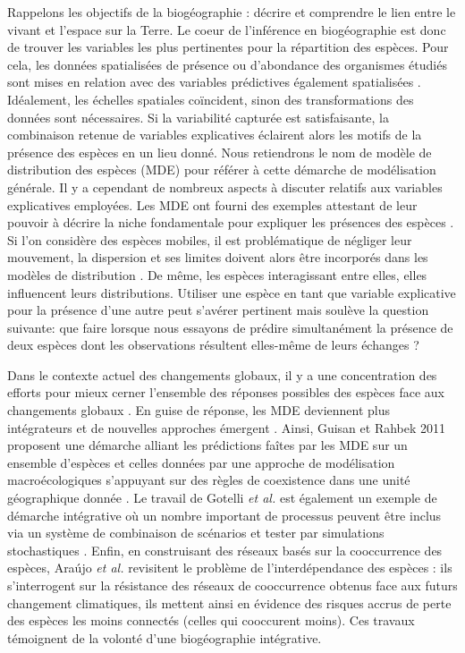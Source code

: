 Rappelons les objectifs de la biogéographie : décrire et comprendre le
lien entre le vivant et l'espace sur la Terre. Le coeur de l'inférence
en biogéographie est donc de trouver les variables les plus pertinentes
pour la répartition des espèces. Pour cela, les données spatialisées de
présence ou d'abondance des organismes étudiés sont mises en relation
avec des variables prédictives également spatialisées
\cite{Guisan2005,Peterson2011,Elith2009a}. Idéalement, les échelles
spatiales coïncident, sinon des transformations des données sont
nécessaires. Si la variabilité capturée est satisfaisante, la
combinaison retenue de variables explicatives éclairent alors les motifs
de la présence des espèces en un lieu donné. Nous retiendrons le nom de
modèle de distribution des espèces (MDE) pour référer à cette démarche
de modélisation générale. Il y a cependant de nombreux aspects à
discuter relatifs aux variables explicatives employées. Les MDE ont
fourni des exemples attestant de leur pouvoir à décrire la niche
fondamentale pour expliquer les présences des espèces
\cite{Kearney2004}. Si l'on considère des espèces mobiles, il est
problématique de négliger leur mouvement, la dispersion et ses limites
doivent alors être incorporés dans les modèles de distribution
\cite{Gotelli2009}. De même, les espèces interagissant entre elles,
elles influencent leurs distributions. Utiliser une espèce en tant que
variable explicative pour la présence d'une autre peut s'avérer
pertinent \cite{Araujo2007,Pearson2003} mais soulève la question
suivante: que faire lorsque nous essayons de prédire simultanément la
présence de deux espèces dont les observations résultent elles-même de
leurs échanges ?

Dans le contexte actuel des changements globaux, il y a une
concentration des efforts pour mieux cerner l'ensemble des réponses
possibles des espèces face aux changements globaux \cite{Bellard2012}.
En guise de réponse, les MDE deviennent plus intégrateurs et de
nouvelles approches émergent \cite{Kissling2011}. Ainsi, Guisan et
Rahbek 2011 proposent une démarche alliant les prédictions faîtes par
les MDE sur un ensemble d'espèces et celles données par une approche de
modélisation macroécologiques s'appuyant sur des règles de coexistence
dans une unité géographique donnée \cite{Guisan2011}. Le travail de
Gotelli \textit{et al.} est également un exemple de démarche intégrative
où un nombre important de processus peuvent être inclus via un système
de combinaison de scénarios et tester par simulations stochastiques
\cite{Gotelli2009}. Enfin, en construisant des réseaux basés sur la
cooccurrence des espèces, Araújo \textit{et al.} revisitent le problème
de l'interdépendance des espèces \cite{Araujo2011} : ils s'interrogent
sur la résistance des réseaux de cooccurrence obtenus face aux futurs
changement climatiques, ils mettent ainsi en évidence des risques accrus
de perte des espèces les moins connectés (celles qui cooccurent moins).
Ces travaux témoignent de la volonté d'une biogéographie intégrative.

